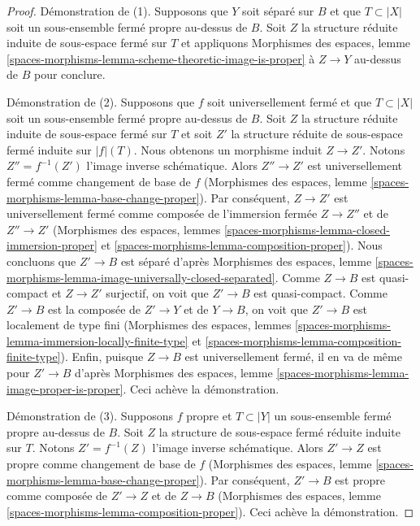 \begin{proof}
Démonstration de (1). Supposons que $Y$ soit séparé sur $B$ et que $T \subset |X|$
soit un sous-ensemble fermé propre au-dessus de $B$. Soit $Z$ la structure réduite induite
de sous-espace fermé sur $T$ et appliquons
Morphismes des espaces, lemme
\ref{spaces-morphisms-lemma-scheme-theoretic-image-is-proper}
à $Z \to Y$ au-dessus de $B$ pour conclure.

\medskip\noindent
Démonstration de (2). Supposons que $f$ soit universellement fermé et que $T \subset |X|$ soit un
sous-ensemble fermé propre au-dessus de $B$. Soit $Z$ la structure réduite induite
de sous-espace fermé sur $T$ et soit $Z'$ la structure réduite
de sous-espace fermé induite sur $|f|(T)$. Nous obtenons un morphisme
induit $Z \to Z'$.
Notons $Z'' = f^{-1}(Z')$ l'image inverse schématique.
Alors $Z'' \to Z'$ est universellement fermé comme changement de base de $f$
(Morphismes des espaces, lemme \ref{spaces-morphisms-lemma-base-change-proper}).
Par conséquent, $Z \to Z'$ est universellement fermé comme composée de
l'immersion fermée $Z \to Z''$ et de $Z'' \to Z'$
(Morphismes des espaces, lemmes
\ref{spaces-morphisms-lemma-closed-immersion-proper} et
\ref{spaces-morphisms-lemma-composition-proper}).
Nous concluons que $Z' \to B$ est séparé d'après
Morphismes des espaces, lemme
\ref{spaces-morphisms-lemma-image-universally-closed-separated}.
Comme $Z \to B$ est quasi-compact et $Z \to Z'$ surjectif,
on voit que $Z' \to B$ est quasi-compact.
Comme $Z' \to B$ est la composée de $Z' \to Y$ et de $Y \to B$,
on voit que $Z' \to B$ est localement de type fini
(Morphismes des espaces, lemmes
\ref{spaces-morphisms-lemma-immersion-locally-finite-type} et
\ref{spaces-morphisms-lemma-composition-finite-type}).
Enfin, puisque $Z \to B$ est universellement fermé,
il en va de même pour $Z' \to B$ d'après
Morphismes des espaces, lemme
\ref{spaces-morphisms-lemma-image-proper-is-proper}.
Ceci achève la démonstration.

\medskip\noindent
Démonstration de (3). Supposons $f$ propre et $T \subset |Y|$ un sous-ensemble fermé
propre au-dessus de $B$. Soit $Z$ la structure de sous-espace fermé réduite induite
sur $T$. Notons $Z' = f^{-1}(Z)$ l'image inverse schématique.
Alors $Z' \to Z$ est propre comme changement de base de $f$
(Morphismes des espaces, lemme \ref{spaces-morphisms-lemma-base-change-proper}).
Par conséquent, $Z' \to B$ est propre comme composée de $Z' \to Z$
et de $Z \to B$
(Morphismes des espaces, lemme \ref{spaces-morphisms-lemma-composition-proper}).
Ceci achève la démonstration.
\end{proof}

